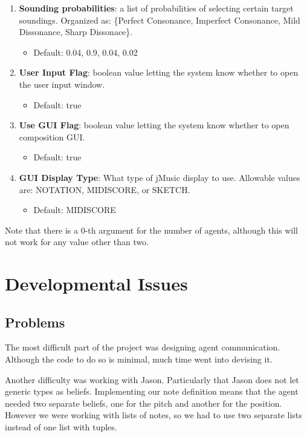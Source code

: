 \documentclass[12pt]{article}
\begin{document}
\begin{enumerate}
		\item {\bf Sounding probabilities}: a list of probabilities of selecting certain target soundings. Organized as: \{Perfect Consonance, Imperfect Consonance, Mild Dissonance, Sharp Dissonace\}.
		\begin{itemize}
			\item Default: 0.04, 0.9, 0.04, 0.02
		\end{itemize}
	
		\item {\bf User Input Flag}: boolean value letting the system know whether to open the user input window.
		\begin{itemize}
			\item Default: true
		\end{itemize}
	
		\item {\bf Use GUI Flag}: boolean value letting the system know whether to open composition GUI.
		\begin{itemize}
			\item Default: true
		\end{itemize}
	
		\item {\bf GUI Display Type}: What type of jMusic display to use. Allowable values are: NOTATION, MIDISCORE, or SKETCH.
		\begin{itemize}
			\item Default: MIDISCORE
		\end{itemize}
	\end{enumerate}
	Note that there is a 0-th argument for the number of agents, although this will not work for any value other than two.
	
	\section{Developmental Issues}
	\subsection{Problems}
	The most difficult part of the project was designing agent communication. Although the code to do so is minimal, much time went into devising it.
	
	Another difficulty was working with Jason. Particularly that Jason does not let generic types as beliefs. Implementing our note definition means that the agent needed two separate beliefs, one for the pitch and another for the position. However we were working with lists of notes, so we had to use two separate lists instead of one list with tuples.
	
\end{document}
